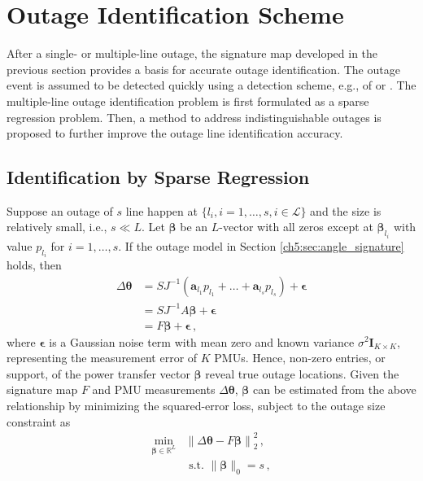 \section{Outage Identification Scheme}
\label{ch5:sec:identification_scheme}
After a single- or multiple-line outage, the signature map developed in the previous section provides a basis for accurate outage identification. The outage event is assumed to be detected quickly using a detection scheme, e.g., of \cite{yang2020control} or \cite{yang2021dynamic}. The multiple-line outage identification problem is first formulated as a sparse regression problem. Then, a method to address indistinguishable outages is proposed to further improve the outage line identification accuracy. 

\subsection{Identification by Sparse Regression}
\label{ch5:sec:sparse_regression}
Suppose an outage of $s$ line happen at $\{l_i, i=1, \dots, s, i \in \mathcal{L}\}$ and the size is relatively small, i.e., $s \ll L$. Let $\boldsymbol{\beta}$ be an $L$-vector with all zeros except at $\boldsymbol{\beta}_{l_i}$ with value $p_{l_i}$ for $i = 1, \dots, s$.
If the outage model in Section \ref{ch5:sec:angle_signature} holds, then
\begin{align}
    \Delta\boldsymbol{\theta} &= S J^{-1} (\mathbf{a}_{l_1} p_{l_1} + \dots + \mathbf{a}_{l_s} p_{l_s}) + \boldsymbol{\epsilon} \nonumber\\
    &= S J^{-1} A \boldsymbol{\beta} + \boldsymbol{\epsilon} \nonumber\\
    &= F \boldsymbol{\beta} + \boldsymbol{\epsilon}  \,,
\end{align}
where $\boldsymbol{\epsilon}$ is a Gaussian noise term with mean zero and known variance $\sigma^2 \textbf{I}_{K\times K}$, representing the measurement error of $K$ PMUs. Hence, non-zero entries, or support, of the power transfer vector $\boldsymbol{\beta}$ reveal true outage locations. Given the signature map $F$ and PMU measurements $\Delta\boldsymbol{\theta}$, $\boldsymbol{\beta}$ can be estimated from the above relationship by minimizing the squared-error loss, subject to the outage size constraint as
\begin{align}
\label{ch5:eqn:l_0_formulation}
\underset{\boldsymbol{\beta} \in \mathbb{R}^{L}}{\min} &\left\|\Delta\boldsymbol{\theta} - F\boldsymbol{\beta}\right\|_{2}^{2} \,, \\
& \text { s.t. }\|\boldsymbol{\beta}\|_{0} = s \nonumber\,,
\end{align}
